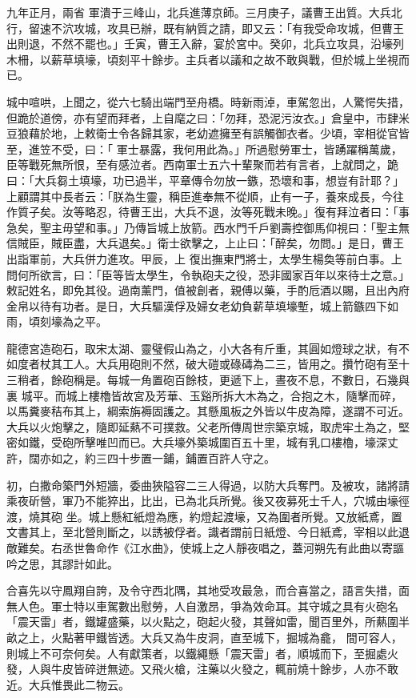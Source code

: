 \begin{pinyinscope}
 九年正月，兩省
 軍潰于三峰山，北兵進薄京師。三月庚子，議曹王出質。大兵北行，留速不泬攻城，攻具已辦，既有納質之請，即又云：「有我受命攻城，但曹王出則退，不然不罷也。」壬寅，曹王入辭，宴於宮中。癸卯，北兵立攻具，沿壕列木柵，以薪草填壕，頃刻平十餘步。主兵者以議和之故不敢與戰，但於城上坐視而已。



 城中喧哄，上聞之，從六七騎出端門至舟橋。時新雨淖，車駕忽出，人驚愕失措，但跪於道傍，亦有望而拜者，上自麾之曰：「勿拜，恐泥污汝衣。」倉皇中，市肆米豆狼藉於地，上敕衛士令各歸其家，老幼遮擁至有誤觸御衣者。少頃，宰相從官皆至，進笠不受，曰：「
 軍士暴露，我何用此為。」所過慰勞軍士，皆踴躍稱萬歲，臣等戰死無所恨，至有感泣者。西南軍士五六十輩聚而若有言者，上就問之，跪曰：「大兵芻土填壕，功已過半，平章傳令勿放一鏃，恐壞和事，想豈有計耶？」上顧謂其中長者云：「朕為生靈，稱臣進奉無不從順，止有一子，養來成長，今往作質子矣。汝等略忍，待曹王出，大兵不退，汝等死戰未晚。」復有拜泣者曰：「事急矣，聖主毋望和事。」乃傳旨城上放箭。西水門千戶劉壽控御馬仰視曰：「聖主無信賊臣，賊臣盡，大兵退矣。」衛士欲擊之，上止曰：「醉矣，勿問。」是日，曹王出詣軍前，大兵併力進攻。甲辰，上
 復出撫東門將士，太學生楊奐等前白事。上問何所欲言，曰：「臣等皆太學生，令執砲夫之役，恐非國家百年以來待士之意。」敕記姓名，即免其役。過南薰門，值被創者，親傅以藥，手酌卮酒以賜，且出內府金帛以待有功者。是日，大兵驅漢俘及婦女老幼負薪草填壕塹，城上箭鏃四下如雨，頃刻壕為之平。



 龍德宮造砲石，取宋太湖、靈璧假山為之，小大各有斤重，其圓如燈球之狀，有不如度者杖其工人。大兵用砲則不然，破大磑或碌碡為二三，皆用之。攢竹砲有至十三稍者，餘砲稱是。每城一角置砲百餘枝，更遞下上，晝夜不息，不數日，石幾與裏
 城平。而城上樓櫓皆故宮及芳華、玉谿所拆大木為之，合抱之木，隨擊而碎，以馬糞麥秸布其上，綱索旃褥固護之。其懸風板之外皆以牛皮為障，遂謂不可近。大兵以火炮擊之，隨即延爇不可撲救。父老所傳周世宗築京城，取虎牢土為之，堅密如鐵，受砲所擊唯凹而已。大兵壕外築城圍百五十里，城有乳口樓櫓，壕深丈許，闊亦如之，約三四十步置一鋪，鋪置百許人守之。



 初，白撒命築門外短牆，委曲狹隘容二三人得過，以防大兵奪門。及被攻，諸將請乘夜斫營，軍乃不能猝出，比出，已為北兵所覺。後又夜募死士千人，穴城由壕徑渡，燒其砲
 坐。城上懸紅紙燈為應，約燈起渡壕，又為圍者所覺。又放紙鳶，置文書其上，至北營則斷之，以誘被俘者。識者謂前日紙燈、今日紙鳶，宰相以此退敵難矣。右丞世魯命作《江水曲》，使城上之人靜夜唱之，蓋河朔先有此曲以寄謳吟之思，其謬計如此。



 合喜先以守鳳翔自誇，及令守西北隅，其地受攻最急，而合喜當之，語言失措，面無人色。軍士特以車駕數出慰勞，人自激昂，爭為效命耳。其守城之具有火砲名「震天雷」者，鐵罐盛藥，以火點之，砲起火發，其聲如雷，聞百里外，所爇圍半畝之上，火點著甲鐵皆透。大兵又為牛皮洞，直至城下，掘城為龕，
 間可容人，則城上不可奈何矣。人有獻策者，以鐵繩懸「震天雷」者，順城而下，至掘處火發，人與牛皮皆碎迸無迹。又飛火槍，注藥以火發之，輒前燒十餘步，人亦不敢近。大兵惟畏此二物云。




\end{pinyinscope}
